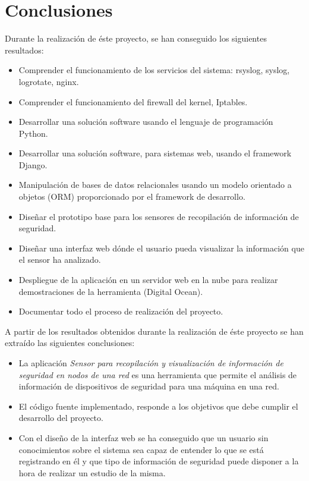 \chapter{Conclusiones}
\label{chap:conclusiones}

Durante la realización de éste proyecto, se han conseguido los siguientes resultados:

\begin{itemize}
\item Comprender el funcionamiento de los servicios del sistema: rsyslog, syslog, logrotate, nginx.
\item Comprender el funcionamiento del firewall del kernel, Iptables.
\item Desarrollar una solución software usando el lenguaje de programación Python.
\item Desarrollar una solución software, para sistemas web, usando el framework Django.
\item Manipulación de bases de datos relacionales usando un modelo orientado a objetos (ORM) proporcionado por el framework de desarrollo.
\item Diseñar el prototipo base para los sensores de recopilación de información de seguridad.
\item Diseñar una interfaz web dónde el usuario pueda visualizar la información que el sensor ha analizado.
\item Despliegue de la aplicación en un servidor web en la nube para realizar demostraciones de la herramienta (Digital Ocean).
\item Documentar todo el proceso de realización del proyecto.
\end{itemize}
\pagebreak
A partir de los resultados obtenidos durante la realización de éste proyecto se han extraído las siguientes conclusiones:

\begin{itemize}
\item La aplicación \textit{Sensor para recopilación y visualización de información de seguridad en nodos de una red} es una herramienta que permite el análisis de información de dispositivos de seguridad para una máquina en una red.
\item El código fuente implementado, responde a los objetivos que debe cumplir el desarrollo del proyecto.
\item Con el diseño de la interfaz web se ha conseguido que un usuario sin conocimientos sobre el sistema sea capaz de entender lo que se está registrando en él y que tipo de información de seguridad puede disponer a la hora de realizar un estudio de la misma.
\end{itemize}
